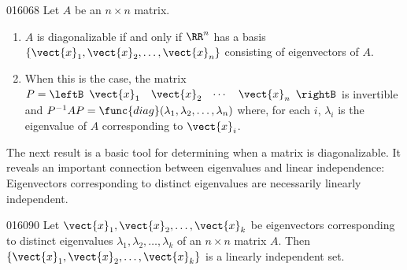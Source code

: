 \begin{theorem}{}{016068} %
Let $A$ be an $n \times n$ matrix.

\begin{enumerate}
\item $A$ is diagonalizable if and only if $\RR^n$ has a basis $\{\vect{x}_{1}, \vect{x}_{2}, \dots, \vect{x}_{n}\}$ consisting of eigenvectors of $A$.

\item When this is the case, the matrix $P = 
\leftB \begin{array}{cccc}
\vect{x}_{1} & \vect{x}_{2} & \cdots & \vect{x}_{n}
\end{array} \rightB$
 is invertible and $P^{-1}AP = \func{diag}(\lambda_{1}, \lambda_{2}, \dots, \lambda_{n})$ where, for each $i$, $\lambda_{i}$ is the eigenvalue of $A$ corresponding to $\vect{x}_{i}$.

\end{enumerate}
\end{theorem}

The next result is a basic tool for determining when a matrix is diagonalizable. It reveals an important connection between eigenvalues and linear independence: Eigenvectors corresponding to distinct eigenvalues are necessarily linearly independent.

\begin{theorem}{}{016090} %
Let $\vect{x}_{1}, \vect{x}_{2}, \dots, \vect{x}_{k}$ be eigenvectors corresponding to distinct eigenvalues $\lambda_{1}, \lambda_{2}, \dots, \lambda_{k}$ of an $n \times n$ matrix $A$. Then $\{\vect{x}_{1}, \vect{x}_{2}, \dots, \vect{x}_{k}\}$  is a linearly independent set.
\end{theorem}


